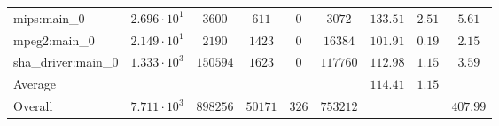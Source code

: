 \begin{tabular}{|l|c|c|c|c|c|c|c|c|}
mips:main\_0            & $ 2.696 \cdot 10^{1} $ & $ 3600   $ & $ 611   $ & $ 0   $ & $ 3072   $ & $ 133.51      $ & $ 2.51    $ & $ 5.61    $ \\
mpeg2:main\_0           & $ 2.149 \cdot 10^{1} $ & $ 2190   $ & $ 1423  $ & $ 0   $ & $ 16384  $ & $ 101.91      $ & $ 0.19    $ & $ 2.15    $ \\
sha\_driver:main\_0     & $ 1.333 \cdot 10^{3} $ & $ 150594 $ & $ 1623  $ & $ 0   $ & $ 117760 $ & $ 112.98      $ & $ 1.15    $ & $ 3.59    $ \\
\hline
Average                 & $                    $ & $        $ & $       $ & $     $ & $        $ & $ 114.41      $ & $ 1.15    $ & $         $ \\
\hline
Overall                 & $ 7.711 \cdot 10^{3} $ & $ 898256 $ & $ 50171 $ & $ 326 $ & $ 753212 $ & $             $ & $         $ & $ 407.99  $ \\
\hline
\end{tabular}
